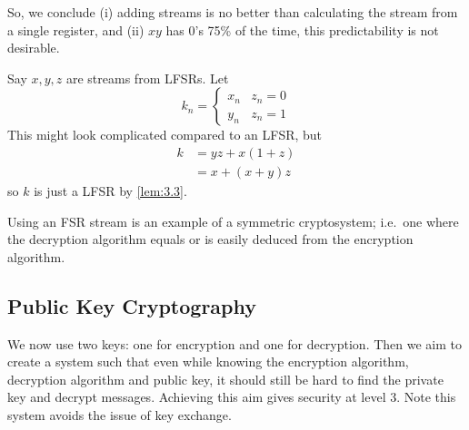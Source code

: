 \documentclass{article}
\newcommand{\1}[1]{\mathbbm{1}_{#1}}
\begin{document}
So, we conclude (i) adding streams is no better than calculating the stream from a single register, and (ii) $xy$ has $0$'s  75\% of the time, this predictability is not desirable.
\begin{eg}
    Say $x,y,z$ are streams from LFSRs. Let
    \begin{equation*}
        k_n =
        \begin{cases}
            x_n & z_n = 0 \\ y_n & z_n = 1
        \end{cases}
    \end{equation*}
    This might look complicated compared to an LFSR, but
    \begin{align*}
        k&=yz+x(1+z)\\&=x+(x+y)z
    \end{align*}
    so $k$ is just a LFSR by \cref{lem:3.3}.
\end{eg}
\begin{remark}
    Using an FSR stream is an example of a symmetric cryptosystem; i.e.\ one where the decryption algorithm equals or is easily deduced from the encryption algorithm.
\end{remark}
\subsection{Public Key Cryptography}
We now use two keys: one for encryption and one for decryption.
Then we aim to create a system such that even while knowing the encryption algorithm, decryption algorithm and public key, it should still be hard to find the private key and decrypt messages.
Achieving this aim gives security at level 3.
Note this system avoids the issue of key exchange.
\end{document}
